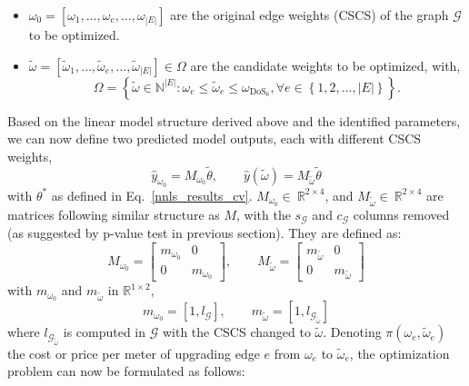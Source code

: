 \documentclass[lettersize,journal]{IEEEtran}
\begin{document}
\begin{itemize}
    \item $\omega_{0} = \left [ \omega_{1}, \ldots, \omega_{e}, \ldots, \omega_{|E|} \right ]$ are the original edge weights (CSCS) of the graph $\mathcal{G}$ to be optimized.
    \item $\tilde \omega = \left [ \tilde{\omega}_{1},  \ldots, \tilde{\omega}_{e}, \ldots,\tilde{\omega}_{|E|} \right ] \in \Omega $ are the candidate weights to be optimized, with,
    \begin{equation} \nonumber
        \Omega = \left \{ \tilde{\omega} \in \mathbb{N}^{|E|} \colon \omega_{e} \leq \tilde{\omega}_{e} \leq \omega_{\text{DoS}_6},  \forall e \in \left \{1,2, \ldots, |E| \right \}  \right\}.
    \end{equation} 
\end{itemize}
Based on the linear model structure derived above and the identified parameters, we can now define two predicted model outputs, each with different CSCS weights,
\begin{equation*}
 \hat{y}_{\omega_{0}} = M_{\omega_{0}} \tilde{\theta}, \quad \quad \hat{y}(\tilde{\omega}) = M_{\tilde{\omega}}\tilde{\theta}
\end{equation*}
with $\theta^{\ast}$ as defined in Eq.~\eqref{nnls_results_cv}.  $M_{\omega_{0}} \in~\mathbb{R}^{2 \times 4}$, and $M_{\tilde{\omega}} \in~\mathbb{R}^{2 \times 4}$ are matrices following similar structure as $M$, with the $s_{\mathcal{G}}$ and $c_{\mathcal{G}}$ columns removed (as suggested by p-value test in previous section). They are defined as:
\begin{equation} \nonumber
    M_{\omega_{0}} = 
    \begin{bmatrix}
        m_{\omega_{0}} & 0\\ 
        0 & m_{\omega_{0}}
            \end{bmatrix} , \quad \quad 
        M_{\tilde{\omega}} = \begin{bmatrix}
        m_{\tilde{\omega}} & 0\\ 
        0 & m_{\tilde{\omega}}
    \end{bmatrix}
\end{equation}
with $m_{\omega_{0}}$ and $m_{\tilde{\omega}}$ in $\mathbb{R}^{1 \times 2}$, 
$$
m_{\omega_{0}} = \left[   1,  l_{\mathcal{G}} \right ],  \quad \quad m_{\tilde{\omega}} = \left[   1,  l_{\mathcal{G}_{\tilde{\omega}}} \right ]
$$
where $l_{\mathcal{G}_{\tilde{\omega}}}$ is computed in $\mathcal{G}$ with the CSCS changed  to  $\tilde{\omega}$. Denoting $\pi(\omega_{e},\tilde{\omega}_{e})$ the cost or price per meter of upgrading edge $e$ from $\omega_{e}$ to $\tilde{\omega}_{e}$, the optimization problem can now be formulated as follows:
\end{document}
